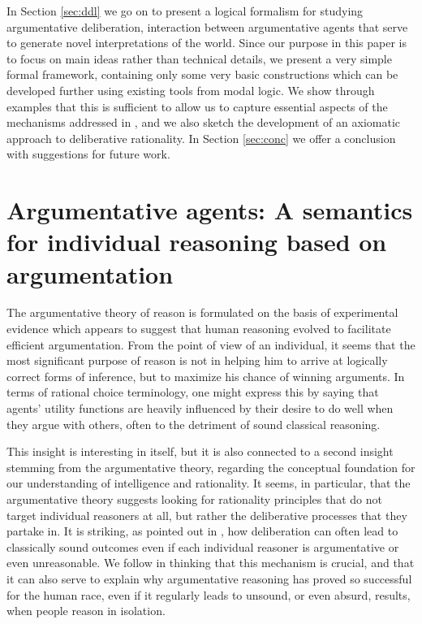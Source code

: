 \documentclass[greybox]{svmult}
\begin{document}
In Section \ref{sec:ddl} we go on to present a logical formalism for studying argumentative deliberation, interaction between argumentative agents that serve to generate novel interpretations of the world. Since our purpose in this paper is to focus on main ideas rather than technical details, we present a very simple formal framework, containing only some very basic constructions which can be developed further using existing tools from modal logic. We show through examples that this is sufficient to allow us to capture essential aspects of the mechanisms addressed in \cite{mercier}, and we also sketch the development of an axiomatic approach to deliberative rationality. In Section \ref{sec:conc} we offer a conclusion with suggestions for future work.

\section{Argumentative agents: A semantics for individual reasoning based on argumentation}\label{sec:arg}

The argumentative theory of reason is formulated on the basis of experimental evidence which appears to suggest that human reasoning evolved to facilitate efficient argumentation. From the point of view of an individual, it seems that the most significant purpose of reason is not in helping him to arrive at logically correct forms of inference, but to maximize his chance of winning arguments. In terms of rational choice terminology, one might express this by saying that agents' utility functions are heavily influenced by their desire to do well when they argue with others, often to the detriment of sound classical reasoning.

This insight is interesting in itself, but it is also connected to a second insight stemming from the argumentative theory, regarding the conceptual foundation for our understanding of intelligence and rationality. 
It seems, in particular, that the argumentative theory suggests looking for rationality principles that do not target individual reasoners at all, but rather the deliberative processes that they partake in. It is striking, as pointed out in \cite{mercier}, how deliberation can often lead to classically sound outcomes even if each individual reasoner is argumentative or even unreasonable. We follow \cite{mercier} in thinking that this mechanism is crucial, and that it can also serve to explain why argumentative reasoning has proved so successful for the human race, even if it regularly leads to unsound, or even absurd, results, when people reason in isolation. 
\end{document}
